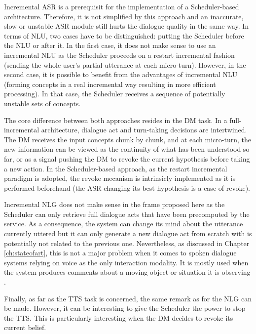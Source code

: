              Incremental ASR is a prerequisit for the implementation of a Scheduler-based architecture. Therefore, it is not simplified by this approach and an inaccurate, slow or unstable ASR module still hurts the dialogue quality in the same way. In terms of NLU, two cases have to be distinguished: putting the Scheduler before the NLU or after it. In the first case, it does not make sense to use an incremental NLU as the Scheduler proceeds on a restart incremental fashion (sending the whole user's partial utterance at each micro-turn). However, in the second case, it is possible to benefit from the advantages of incremental NLU (forming concepts in a real incremental way resulting in more efficient processing). In that case, the Scheduler receives a sequence of potentially unstable sets of concepts.

             The core difference between both approaches resides in the DM task. In a full-incremental architecture, dialogue act and turn-taking decisions are intertwined. The DM receives the input concepts chunk by chunk, and at each micro-turn, the new information can be viewed as the continuity of what has been understood so far, or as a signal pushing the DM to revoke the current hypothesis before taking a new action. In the Scheduler-based approach, as the restart incremental paradigm is adopted, the revoke mecanism is intrinsicly implemented as it is performed beforehand (the ASR changing its best hypothesis is a case of revoke).

             Incremental NLG does not make sense in the frame proposed here as the Scheduler can only retrieve full dialogue acts that have been precomputed by the service. As a consequence, the system can change its mind about the utterance currently uttered but it can only generate a new dialogue act from scratch with is potentially not related to the previous one. Nevertheless, as discussed in Chapter \ref{ch:stateofart}, this is not a major problem when it comes to spoken dialogue systems relying on voice as the only interaction modality. It is mostly used when the system produces comments about a moving object or situation it is observing \cite{Baumann2013}.

             Finally, as far as the TTS task is concerned, the same remark as for the NLG can be made. However, it can be interesting to give the Scheduler the power to stop the TTS. This is particularly interesting when the DM decides to revoke its current belief.

